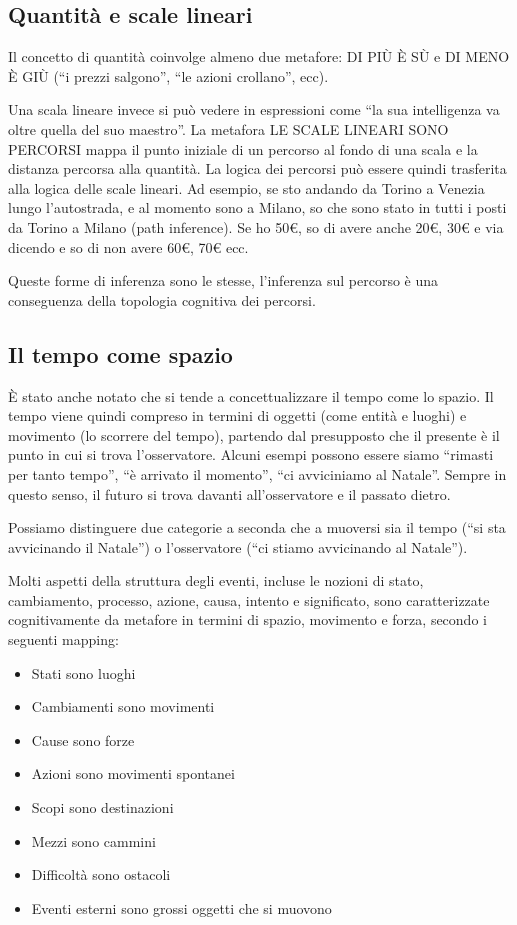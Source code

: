 \subsection{Quantità e scale lineari}
Il concetto di quantità coinvolge almeno due metafore: DI PIÙ È SÙ e DI MENO È GIÙ (``i prezzi salgono'', ``le azioni crollano'', ecc).

Una scala lineare invece si può vedere in espressioni come ``la sua intelligenza va oltre quella del suo maestro''. La metafora LE SCALE LINEARI SONO PERCORSI mappa il punto iniziale di un percorso al fondo di una scala e la distanza percorsa alla quantità. La logica dei percorsi può essere quindi trasferita alla logica delle scale lineari. Ad esempio, se sto andando da Torino a Venezia lungo l’autostrada, e al momento sono a Milano, so che sono stato in tutti i posti da Torino a Milano (path inference). Se ho 50\euro, so di avere anche 20\euro, 30\euro{} e via dicendo e so di non avere 60\euro, 70\euro{} ecc.

Queste forme di inferenza sono le stesse, l’inferenza sul percorso è una conseguenza della topologia cognitiva dei percorsi.

\subsection{Il tempo come spazio}
È stato anche notato che si tende a concettualizzare il tempo come lo spazio. Il tempo viene quindi compreso in termini di oggetti (come entità e luoghi) e movimento (lo scorrere del tempo), partendo dal presupposto che il presente è il punto in cui si trova l’osservatore. Alcuni esempi possono essere siamo ``rimasti per tanto tempo'', ``è arrivato il momento'', ``ci avviciniamo al Natale''. Sempre in questo senso, il futuro si trova davanti all’osservatore e il passato dietro.

Possiamo distinguere due categorie a seconda che a muoversi sia il tempo (``si sta avvicinando il Natale'') o l’osservatore (``ci stiamo avvicinando al Natale'').

Molti aspetti della struttura degli eventi, incluse le nozioni di stato, cambiamento, processo, azione, causa, intento e significato, sono caratterizzate cognitivamente da metafore in termini di spazio, movimento e forza, secondo i seguenti mapping:
\begin{itemize}
  \item Stati sono luoghi
  \item Cambiamenti sono movimenti
  \item Cause sono forze
  \item Azioni sono movimenti spontanei
  \item Scopi sono destinazioni
  \item Mezzi sono cammini
  \item Difficoltà sono ostacoli
  \item Eventi esterni sono grossi oggetti che si muovono
\end{itemize}

